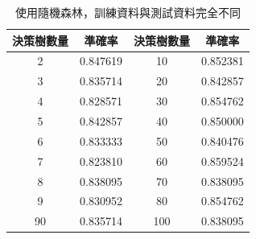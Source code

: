 \documentclass[11pt,a4paper]{extarticle}
\begin{document}
    \begin{table}[H]
        \centering
        \caption{使用隨機森林，訓練資料與測試資料完全不同}\label{tab3}
        \vspace{1em}
        \begin{tabular}{c c | c c}
            \toprule
            決策樹數量 & 準確率 & 決策樹數量 & 準確率 \\
            \midrule
            \hline
            2  & 0.847619  & 10  & 0.852381  \\
            3  & 0.835714  & 20  & 0.842857  \\
            4  & 0.828571  & 30  & 0.854762  \\
            5  & 0.842857  & 40  & 0.850000  \\
            6  & 0.833333  & 50  & 0.840476  \\
            7  & 0.823810  & 60  & 0.859524  \\
            8  & 0.838095  & 70  & 0.838095  \\
            9  & 0.830952  & 80  & 0.854762  \\
            90 & 0.835714  & 100 & 0.838095  \\
            \hline
        \end{tabular}
    \end{table}

              
\end{document}

